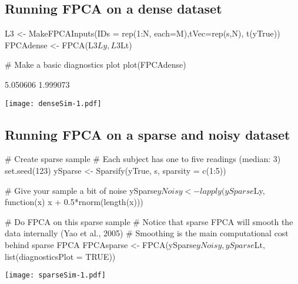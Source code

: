 \documentclass[11pt,english]{article}\usepackage[]{graphicx}\usepackage[]{color}
\begin{document}
\subsection{Running FPCA on a dense dataset }
\begin{minipage}[l]{0.5\textwidth}
\begin{Schunk}
\begin{Sinput}
  L3 <- MakeFPCAInputs(IDs = rep(1:N, each=M),tVec=rep(s,N), t(yTrue))
  FPCAdense <- FPCA(L3$Ly, L3$Lt)   
  
  # Make a basic diagnostics plot
  plot(FPCAdense)
\end{Sinput}
\begin{Soutput}
[1] 5.050606 1.999073
\end{Soutput}
\end{Schunk}
\end{minipage}
\begin{minipage}[r]{0.495\textwidth}
  \texttt{[image: denseSim-1.pdf]}
\end{minipage}

\subsection{Running FPCA on a sparse and noisy dataset }

\begin{minipage}[l]{0.51\textwidth}
\begin{Schunk}
\begin{Sinput}
  # Create sparse sample  
  # Each subject has one to five readings (median: 3)
  set.seed(123)
  ySparse <- Sparsify(yTrue, s, sparsity = c(1:5))
    
  # Give your sample a bit of noise 
  ySparse$yNoisy <- lapply(ySparse$Ly, function(x) x + 0.5*rnorm(length(x))) 
  
  
  # Do FPCA on this sparse sample
  # Notice that sparse FPCA will smooth the data internally (Yao et al., 2005)
  # Smoothing is the main computational cost behind sparse FPCA
  FPCAsparse <- FPCA(ySparse$yNoisy, ySparse$Lt, list(diagnosticsPlot = TRUE))  
\end{Sinput}
\end{Schunk}
\end{minipage}
\begin{minipage}[r]{0.49\textwidth}
  \texttt{[image: sparseSim-1.pdf]}
\end{minipage}
\end{document}
